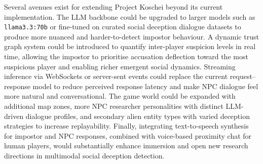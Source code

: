 \par
Several avenues exist for extending Project Koschei beyond its current implementation. The LLM backbone could be upgraded to larger models such as \texttt{llama3.3:70b} or fine-tuned on curated social deception dialogue datasets to produce more nuanced and harder-to-detect impostor behaviour. A dynamic trust graph system could be introduced to quantify inter-player suspicion levels in real time, allowing the impostor to prioritise accusation deflection toward the most suspicious player and enabling richer emergent social dynamics. Streaming inference via WebSockets or server-sent events could replace the current request--response model to reduce perceived response latency and make NPC dialogue feel more natural and conversational. The game world could be expanded with additional map zones, more NPC researcher personalities with distinct LLM-driven dialogue profiles, and secondary alien entity types with varied deception strategies to increase replayability. Finally, integrating text-to-speech synthesis for impostor and NPC responses, combined with voice-based proximity chat for human players, would substantially enhance immersion and open new research directions in multimodal social deception detection.
